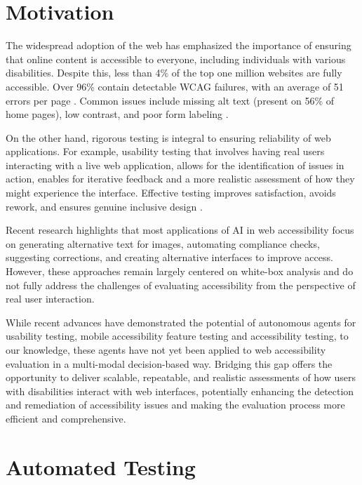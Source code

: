 
\section{Motivation}

The widespread adoption of the web has emphasized the importance of ensuring that online content is accessible to everyone, including individuals with various disabilities\cite{abu2023web}. Despite this, less than 4\% of the top one million websites are fully accessible. Over 96\% contain detectable \ac{WCAG} failures, with an average of 51 errors per page \cite{webaimmillion2025}. Common issues include missing alt text (present on 56\% of home pages), low contrast, and poor form labeling \cite{audioeye2024}.

On the other hand, rigorous testing is integral to ensuring reliability of web applications. For example, usability testing that involves having real users interacting with a live web application, allows for the identification of issues in action, enables for iterative feedback and a more realistic assessment of how they might experience the interface. Effective testing improves satisfaction, avoids rework, and ensures genuine inclusive design \cite{accessdesign2025}.

Recent research highlights that most applications of \ac{AI} in web accessibility focus on generating alternative text for images, automating compliance checks, suggesting corrections, and creating alternative interfaces to improve access\cite{vera2025towards}. However, these approaches remain largely centered on white-box analysis and do not fully address the challenges of evaluating accessibility from the perspective of real user interaction. 

While recent advances have demonstrated the potential of autonomous agents for usability testing\cite{lu2025uxagent}, mobile accessibility feature testing\cite{taeb2024axnav} and accessibility testing\cite{zhong2025screenaudit}, to our knowledge, these agents have not yet been applied to web accessibility evaluation in a multi-modal decision-based way. Bridging this gap offers the opportunity to deliver scalable, repeatable, and realistic assessments of how users with disabilities interact with web interfaces, potentially enhancing the detection and remediation of accessibility issues and making the evaluation process more efficient and comprehensive.

\section{Automated Testing}

